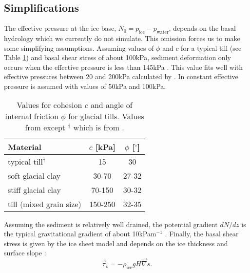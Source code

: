 \subsection{Simplifications}
The effective pressure at the ice base, $N_0=p_{\text{ice}}-p_{\text{water}}$, depends on the basal hydrology which we currently do not simulate. This omission forces us to make some simplifying assumptions. Assuming values of $\phi$ and $c$ for a typical till (see Table \ref{erosion.tab.typical_till}) and basal shear stress of about 100kPa, sediment deformation only occurs when the effective pressure is less than 145kPa \citep{Paterson1994}. This value fits well with effective pressures between 20 and 200kPa calculated by \citet{Boulton1996a}. In \citet{Boulton1996} constant effective pressure is assumed with values of 50kPa and 100kPa.

\begin{table}[htbp]
  \centering
  \begin{tabular}{|l|c|c|}
    \hline
    Material & $c$ [kPa] & $\phi$ [$^\circ$] \\
    \hline
    typical till$^\dag$ & 15 & 30\\
    soft glacial clay & 30-70 & 27-32\\
    stiff glacial clay & 70-150 & 30-32\\
    till (mixed grain size) & 150-250 & 32-35\\
    \hline
  \end{tabular}
  \caption{Values for cohesion $c$ and angle of internal friction $\phi$ for glacial tills. Values from \citet{Benn1998} except $^\dag$ which is from \citet{Clarke1987}.}
  \label{erosion.tab.typical_till}
\end{table}

Assuming the sediment is relatively well drained, the potential gradient $dN/dz$ is the typical gravitational gradient of about 10kPam$^{-1}$ \citep{Boulton1996a}. Finally, the basal shear stress is given by the ice sheet model and depends on the ice thickness and surface slope \citep{Paterson1994}:
\begin{equation}
  \vec\tau_b=-\rho_{\text{ice}}gH\vec\nabla s.
\end{equation}

